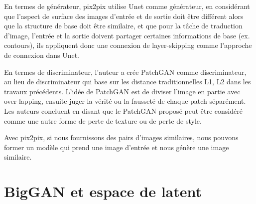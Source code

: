 En termes de générateur, pix2pix utilise Unet comme générateur, en considérant que l'aspect de surface des images d'entrée et de sortie doit être différent alors que la structure de base doit être similaire, et que pour la tâche de traduction d'image, l'entrée et la sortie doivent partager certaines informations de base (ex. contours), ils appliquent donc une connexion de layer-skipping comme l'approche de connexion dans Unet.

En termes de discriminateur, l'auteur a crée PatchGAN comme discriminateur, au lieu de  discriminateur qui base sur les distance traditionnelles L1, L2 dans les travaux précédents. L'idée de PatchGAN est de diviser l'image en partie avec over-lapping, ensuite juger la vérité ou la fausseté de chaque patch séparément. Les auteurs concluent en disant que le PatchGAN proposé peut être considéré comme une autre forme de perte de texture ou de perte de style.

Avec pix2pix, si nous fournissons des pairs d'images similaires, nous pouvons former un modèle qui prend une image d'entrée et nous génère une image similaire.


\section{BigGAN et espace de latent}

